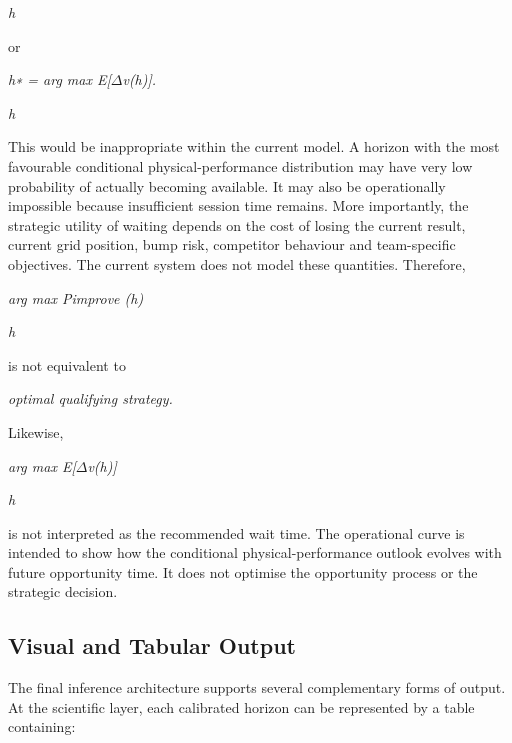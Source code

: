 \begin{center}\textit{h}\end{center}

or

\begin{center}\textit{h∗ = arg max E[\ensuremath{\Delta}v(h)].}\end{center}

\begin{center}\textit{h}\end{center}

This would be inappropriate within the current model. A horizon with the most favourable conditional physical-performance distribution may have very low probability of actually becoming available. It may also be operationally impossible because insufficient session time remains. More importantly, the strategic utility of waiting depends on the cost of losing the current result, current grid position, bump risk, competitor behaviour and team-specific objectives. The current system does not model these quantities. Therefore,

\begin{center}\textit{arg max Pimprove (h)}\end{center}

\begin{center}\textit{h}\end{center}

is not equivalent to

\begin{center}\textit{optimal qualifying strategy.}\end{center}

Likewise,

\begin{center}\textit{arg max E[\ensuremath{\Delta}v(h)]}\end{center}

\begin{center}\textit{h}\end{center}

is not interpreted as the recommended wait time. The operational curve is intended to show how the conditional physical-performance outlook evolves with future opportunity time. It does not optimise the opportunity process or the strategic decision.

\subsection{Visual and Tabular Output}
The final inference architecture supports several complementary forms of output. At the scientific layer, each calibrated horizon can be represented by a table containing:

